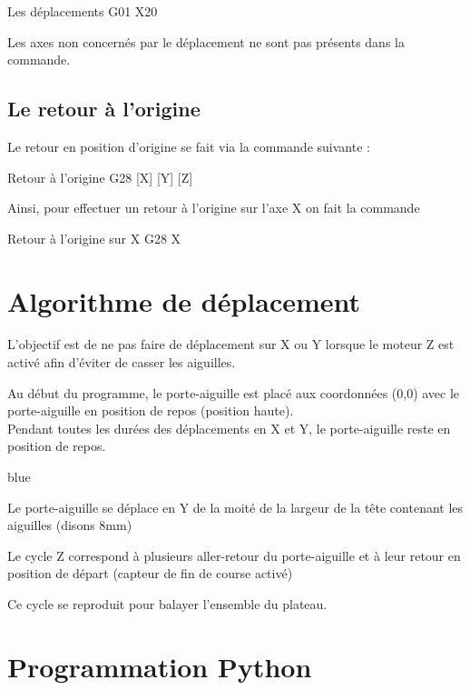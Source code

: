 {\begin{Cpp}{Les déplacements}
G01 X20
\end{Cpp}

Les axes non concernés par le déplacement ne sont pas présents dans la commande.

\section{Le retour à l'origine}

Le retour en position d'origine se fait via la commande suivante : 

\begin{Cpp}{Retour à l'origine}
G28 [X] [Y] [Z]
\end{Cpp}

Ainsi, pour effectuer un retour à l'origine sur l'axe X on fait la commande 

\begin{Cpp}{Retour à l'origine sur X}
G28 X
\end{Cpp}

\chapter{Algorithme de déplacement}

L'objectif est de ne pas faire de déplacement sur X ou Y lorsque le moteur Z est activé afin d'éviter de casser les aiguilles.


Au début du programme, le porte-aiguille est placé aux coordonnées (0,0) avec le porte-aiguille en position de repos (position haute).\\
Pendant toutes les durées des déplacements en X et Y, le porte-aiguille reste en position de repos.
\begin{items}{blue}{\Triangle}
\item Le porte-aiguille se déplace en Y de la moité de la largeur de la tête contenant les aiguilles (disons 8mm)
\item Le cycle Z correspond à plusieurs aller-retour du porte-aiguille et à leur retour en position de départ (capteur de fin de course activé)
\end{items}

Ce cycle se reproduit pour balayer l'ensemble du plateau.



\chapter{Programmation Python}

}

